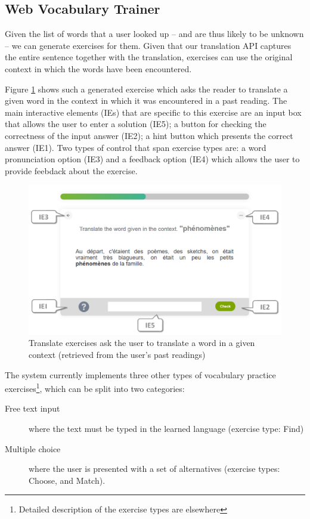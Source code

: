 
\newpage
\subsection{Web Vocabulary Trainer}

Given the list of words that a user looked up -- and are thus likely to be unknown -- we can generate exercises for them. Given that our translation API captures the entire sentence together with the translation, exercises can use the original context in which the words have been encountered.

Figure \ref{fig:exercise_translate} shows such a generated exercise which asks the reader to translate a given word in the context in which it was encountered in a past reading. The main interactive elements (IEs) that are specific to this exercise are an input box that allows the user to enter a solution (IE5); a button for checking the correctness of the input answer (IE2); a hint button which presents the correct answer (IE1). Two types of control that span exercise types are: a word pronunciation option (IE3) and a feedback option (IE4) which allows the user to provide feebdack about the exercise.

\begin{figure}[h!]
\centering
  \includegraphics[width=0.9\columnwidth]{figures/exercise_translate}
  \caption{Translate exercises ask the user to translate a word in a given context (retrieved from the user's past readings)}
  \label{fig:exercise_translate}
\end{figure}

The system currently implements three other types of vocabulary practice exercises\footnote{Detailed description of the exercise types are elsewhere\cite{Avagyan17a-blocks}}, which can be split into two categories: 
\begin{description}
	
	\item [Free text input] where the text must be typed in the learned language (exercise type: Find)

	\item [Multiple choice] where the user is presented with a set of alternatives (exercise types: Choose, and Match). 

\end{description}

